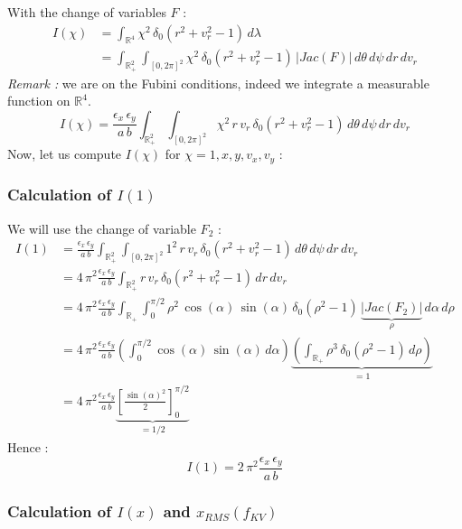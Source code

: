 \documentclass[10pt]{article}
\begin{document}
With the change of variables $F$ :
\begin{align*}
I(\chi) &= \int_{\mathbb{R}^{4}}\chi^{2}\, \delta_{0}\left(r^2+v_r^2-1\right)\,d\lambda \\
&= \int_{\mathbb{R}_{+}^2}\int_{[0,2\pi]^2} \chi^{2}\,\delta_{0}(r^2+v_r^2-1)\,|Jac(F)|\,d\theta\,d\psi\,dr\,dv_r
\end{align*}
\textit{Remark :} we are on the Fubini conditions, indeed we integrate a measurable function on $\mathbb{R}^4$. \\
$$I(\chi) = \frac{\epsilon_{x}\,\epsilon_{y}}{a\,b}\int_{\mathbb{R}_{+}^2}\int_{[0,2\pi]^2} \chi^{2}\,r\,v_r\,\delta_{0}(r^2+v_r^2-1)\,d\theta\,d\psi\,dr\,dv_r
$$
Now, let us compute $I(\chi)$ for $\chi = 1,x,y,v_x,v_y$ : \\


\subsubsection{Calculation of $I(1)$}


We will use the change of variable $F_2$ : \\
\begin{align*}
I(1) &= \frac{\epsilon_{x}\,\epsilon_{y}}{a\,b}\int_{\mathbb{R}_{+}^2}\int_{[0,2\pi]^2} 1^2\,r\,v_r\,\delta_{0}(r^2+v_r^2-1)\,d\theta\,d\psi\,dr\,dv_r \\
&= 4\,\pi^{2}\frac{\epsilon_{x}\,\epsilon_{y}}{a\,b}\int_{\mathbb{R}_{+}^2} r\,v_r\,\delta_{0}(r^2+v_r^2-1)\,dr\,dv_r \\
&= 4\,\pi^{2}\frac{\epsilon_{x}\,\epsilon_{y}}{a\,b}\int_{\mathbb{R}_{+}}\int_{0}^{\pi/2} \rho^{2}\,\cos(\alpha)\,\sin(\alpha)\,\delta_{0}(\rho^{2}-1)\,\underbrace{|Jac(F_2)|}_{\rho}\,d\alpha\,d\rho \\
&= 4\,\pi^{2}\frac{\epsilon_{x}\,\epsilon_{y}}{a\,b} \left(\int_{0}^{\pi/2} \cos(\alpha)\,\sin(\alpha)\,d\alpha\right) \underbrace{\left(\int_{\mathbb{R}_{+}}\rho^{3}\,\delta_{0}(\rho^{2}-1)\,d\rho \right)}_{= 1} \\
&= 4\,\pi^{2}\frac{\epsilon_{x}\,\epsilon_{y}}{a\,b} \underbrace{\left[\frac{\sin(\alpha)^2}{2}\right]_{0}^{\pi/2}}_{= 1/2}
\end{align*}
Hence :
$$\boxed{I(1) = 2\,\pi^{2}\frac{\epsilon_{x}\,\epsilon_{y}}{a\,b}}$$


\subsubsection{Calculation of $I(x)$ and $x_{RMS}(f_{KV})$}
\end{document}
